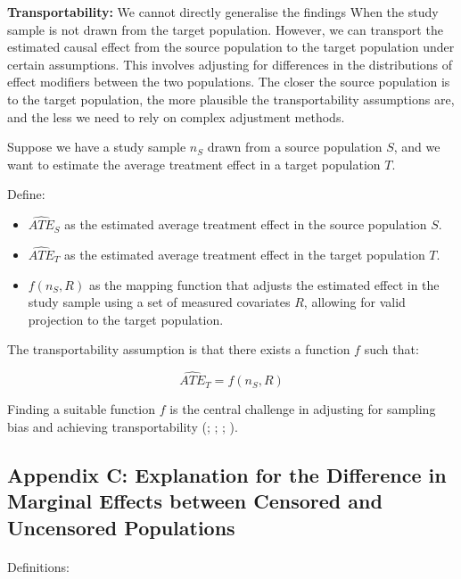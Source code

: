 \documentclass[
  single column]{article}
\makeatletter
\let\oldparagraph\paragraph
\renewcommand{\paragraph}{
    \@ifstar
      \xxxParagraphStar
      \xxxParagraphNoStar
  }
\newcommand{\xxxParagraphStar}[1]{\oldparagraph*{#1}\mbox{}}
\newcommand{\xxxParagraphNoStar}[1]{\oldparagraph{#1}\mbox{}}
\providecommand{\tightlist}{%
  \setlength{\itemsep}{0pt}\setlength{\parskip}{0pt}}\usepackage{longtable,booktabs,array}
\makeatother
\begin{document}
\textbf{Transportability:} We cannot directly generalise the findings
When the study sample is not drawn from the target population. However,
we can transport the estimated causal effect from the source population
to the target population under certain assumptions. This involves
adjusting for differences in the distributions of effect modifiers
between the two populations. The closer the source population is to the
target population, the more plausible the transportability assumptions
are, and the less we need to rely on complex adjustment methods.

Suppose we have a study sample \(n_S\) drawn from a source population
\(S\), and we want to estimate the average treatment effect in a target
population \(T\).

Define:

\begin{itemize}
\tightlist
\item
  \(\widehat{ATE}_{S}\) as the estimated average treatment effect in the
  source population \(S\).
\item
  \(\widehat{ATE}_{T}\) as the estimated average treatment effect in the
  target population \(T\).
\item
  \(f(n_S, R)\) as the mapping function that adjusts the estimated
  effect in the study sample using a set of measured covariates \(R\),
  allowing for valid projection to the target population.
\end{itemize}

The transportability assumption is that there exists a function \(f\)
such that:

\[
\widehat{ATE}_{T} = f(n_S, R)
\]

Finding a suitable function \(f\) is the central challenge in adjusting
for sampling bias and achieving transportability
(;
;
;
).

\newpage{}

\subsection{Appendix C: Explanation for the Difference in Marginal
Effects between Censored and Uncensored Populations}\label{id-app-c}

\paragraph{Definitions:}\label{definitions}
\end{document}
